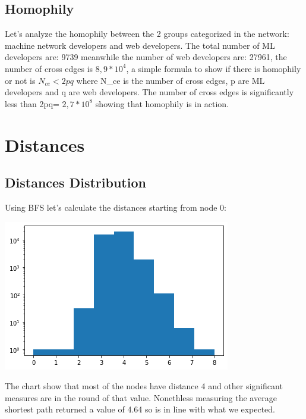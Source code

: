 \documentclass[]{article}
\begin{document}
    \subsection*{Homophily} 
    Let's analyze the homophily between the 2 groups categorized in the network: machine network developers and web developers. The total number of ML developers are: 9739 meanwhile the number of web developers are: 27961, the number of cross edges is $8,9*10^4$, a simple formula to show if there is homophily or not is $N_{ce} < 2pq$ where N\_ce is the number of cross edges, p are ML developers and q are web developers. The number of cross edges is significantly less than 2pq= $ 2,7*10^8$ showing that homophily is in action.
    
    \section*{Distances}  
    \subsection*{Distances Distribution}
    Using BFS let's calculate the distances starting from node 0:
    \begin{center}
        \includegraphics[scale=0.5]{charts/distances.png}
    \end{center}
    The chart show that most of the nodes have distance 4 and other significant measures are in the round of that value. Nonethless measuring the average shortest path returned a value of 4.64 so is in line with what we expected. 
\end{document}
